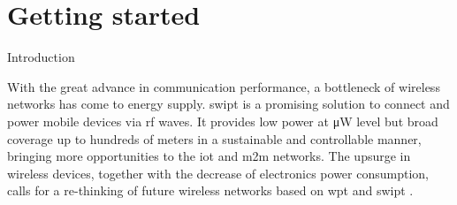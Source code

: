 
\chapter{Getting started}  %

\graphicspath{{assets/chapter_1/}}


\begin{section}{Introduction}
	\begin{subsection}{}
		With the great advance in communication performance, a bottleneck of wireless networks has come to energy supply. \gls{swipt} is a promising solution to connect and power mobile devices via \gls{rf} waves. It provides low power at \si{\uW} level but broad coverage up to hundreds of meters in a sustainable and controllable manner, bringing more opportunities to the \gls{iot} and \gls{m2m} networks. The upsurge in wireless devices, together with the decrease of electronics power consumption, calls for a re-thinking of future wireless networks based on \gls{wpt} and \gls{swipt} \cite{Clerckx2019}.


\end{subsection}
\end{section}
